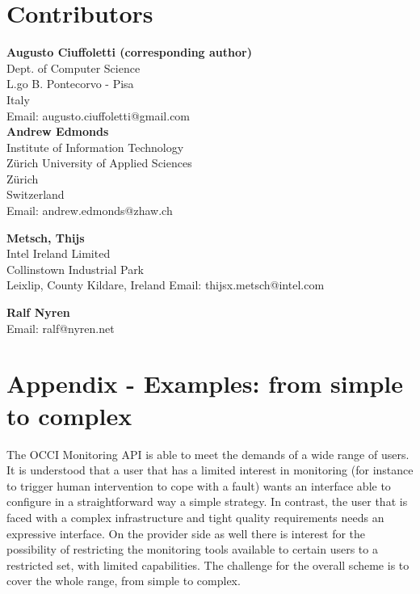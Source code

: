 \documentclass[10pt]{article}  %
\begin{document}




\section{Contributors}

\textbf{Augusto Ciuffoletti (corresponding author)} \\
Dept. of Computer Science \\
L.go B. Pontecorvo - Pisa\\
Italy \\
Email: augusto.ciuffoletti@gmail.com \\

\textbf{Andrew Edmonds}\\
Institute of Information Technology \\
Zürich University of Applied Sciences \\
Zürich \\
Switzerland \\
Email: andrew.edmonds@zhaw.ch

\textbf{Metsch, Thijs} \\
Intel Ireland Limited \\
Collinstown Industrial Park \\
Leixlip, County Kildare, Ireland
Email: thijsx.metsch@intel.com

\textbf{Ralf Nyren} \\
Email: ralf@nyren.net 



\appendix

\section*{Appendix - Examples: from simple to complex}

The OCCI Monitoring API is able to meet the demands of a wide range of users. It is understood that a user that has a limited interest in monitoring (for instance to trigger human intervention to cope with a fault) wants an interface able to configure in a straightforward way a simple strategy. In contrast, the user that is faced with a complex infrastructure and tight quality requirements needs an expressive interface. On the provider side as well there is interest for the possibility of restricting the monitoring tools available to certain users to a restricted set, with limited capabilities. The challenge for the overall scheme is to cover the whole range, from simple to complex.
\end{document}
